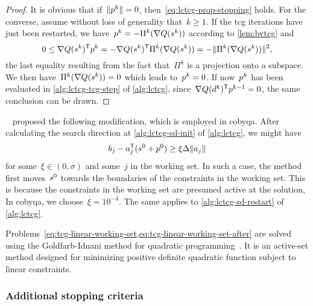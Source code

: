 \begin{proof}
    It is obvious that if~$\norm{\pstep[k]} = 0$, then~\cref{eq:lctcg-prop-stopping} holds.
    For the converse, assume without loss of generality that~$k \ge 1$.
    If the \gls{tcg} iterations have just been restarted, we have~$\pstep[k] = -\Pi^k(\nabla Q(\sstep[k]))$ according to \cref{lem:bvtcg} and
    \begin{equation*}
        0 \le \nabla Q (\sstep[k])^{\T} \pstep[k] = - \nabla Q (\sstep[k])^{\T} \Pi^k(\nabla Q(\sstep[k])) = -\norm{\Pi^k(\nabla Q(\sstep[k]))}^2,
    \end{equation*}
    the last equality resulting from the fact that~$\Pi^k$ is a projection onto a subspace.
    We then have~$\Pi^k(\nabla Q(\sstep[k])) = 0$ which leads to~$\pstep[k] = 0$.
    If now~$\pstep[k]$ has been evaluated in \cref{alg:lctcg-tcg-step} of \cref{alg:lctcg}, since~$\nabla Q(\step[k])^{\T} \pstep[k - 1] = 0$, the same conclusion can be drawn.
\end{proof}

~\cite{Powell_2015} proposed the following modification, which is employed in \gls{cobyqa}.
After calculating the search direction at \cref{alg:lctcg-sd-init} of \cref{alg:lctcg}, we might have
\begin{equation*}
    b_j - a_j^{\T} (\sstep[0] + \pstep[0]) \ge \xi \rad \norm{a_j}
\end{equation*}
for some~$\xi \in (0, \sigma)$ and some~$j$ in the working set.
In such a case, the method first moves~$\sstep[0]$ towards the boundaries of the constraints in the working set.
This is because the constraints in the working set are presumed active at the solution,
In \gls{cobyqa}, we choose~$\xi = 10^{-4}$.
The same applies to \cref{alg:lctcg-sd-restart} of \cref{alg:lctcg}.

Problems~\cref{eq:tcg-linear-working-set,eq:tcg-linear-working-set-after} are solved using the Goldfarb-Idnani method for quadratic programming~\cite{Goldfarb_Idnani_1983}.
It is an active-set method designed for minimizing positive definite quadratic function subject to linear constraints.

\subsubsection{Additional stopping criteria}

